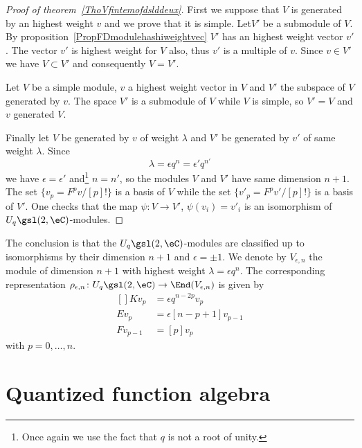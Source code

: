 \begin{proof}[Proof of theorem~\ref{ThoVfintemofdslddeux}]
	First we suppose that \( V\) is generated by an highest weight \( v\) and we prove that it is simple. Let\( V'\) be a submodule of \( V\). By proposition~\ref{PropFDmodulehashiweightvec} \( V'\) has an highest weight vector \( v'\). The vector \( v'\) is highest weight for \( V\) also, thus \( v'\) is a multiple of \( v\). Since \( v\in V'\) we have \( V\subset V'\) and consequently \( V=V'\).

	Let \( V\) be a simple module, $v$ a highest weight vector in \( V\) and \( V'\) the subspace of \( V\) generated by \( v\). The space \( V'\) is a submodule of \( V\) while \( V\) is simple, so \( V'=V\) and \( v\) generated \( V\).


	Finally let \( V\) be generated by \( v\) of weight \( \lambda\) and \( V'\) be generated by \( v'\) of same weight \( \lambda\). Since
	\begin{equation}
		\lambda=\epsilon q^n=\epsilon'q^{n'}
	\end{equation}
	we have \( \epsilon=\epsilon'\) and\footnote{Once again we use the fact that \( q\) is not a root of unity.} \( n=n'\), so the modules \( V\) and \( V'\) have same dimension \( n+1\). The set \( \{ v_p=F^pv/[p]! \}\) is a basis of \( V\) while the set \( \{ v'_p=F^pv'/[p]! \}\) is a basis of \( V'\). One checks that the map \( \psi\colon V\to V'\), \( \psi(v_i)=v'_i\) is an isomorphism of \( U_q\gsl(2,\eC)\)-modules.
\end{proof}

The conclusion is that the \( U_q\gsl(2,\eC)\)-modules are classified up to isomorphisms by their dimension \( n+1\) and \( \epsilon=\pm 1\). We denote by \( V_{\epsilon,n}\) the module of dimension \( n+1\) with highest weight \( \lambda=\epsilon q^n\). The corresponding representation \( \rho_{\epsilon,n}\colon U_q\gsl(2,\eC)\to \End(V_{\epsilon,n})\) is given by
\begin{equation}
	\begin{aligned}[]
		Kv_p     & =\epsilon q^{n-2p}v_p   \\
		Ev_p     & =\epsilon[n-p+1]v_{p-1} \\
		Fv_{p-1} & =[p]v_p
	\end{aligned}
\end{equation}
with \( p=0,\ldots,n\).

\section{Quantized function algebra}

